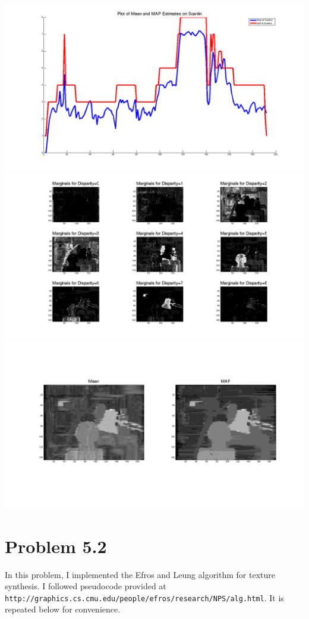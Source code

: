 \documentclass[12pt,twoside]{article}
\newcommand{\tabUnit}{3ex}
\newcommand{\tabT}{\hspace*{\tabUnit}}
\begin{document}
    \includegraphics[scale=.15]{5_1e}
    \includegraphics[scale=.15]{5_1f} \newline
    \includegraphics[scale=.15]{5_1g}


\section*{Problem 5.2}
\tabT In this problem, I implemented the Efros and Leung algorithm for texture synthesis.  I followed pseudocode provided at \texttt{http://graphics.cs.cmu.edu/people/efros/research/NPS/alg.html}.  It is repeated below for convenience.
\newline
\end{document}
